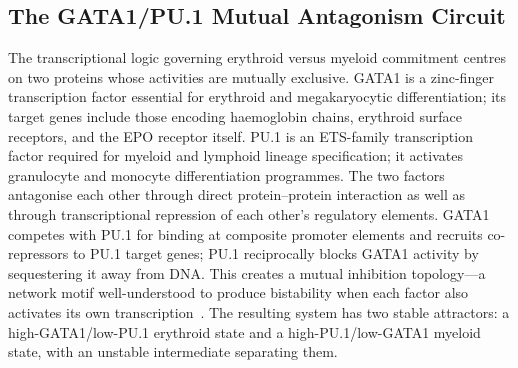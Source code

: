 
\subsection{The GATA1/PU.1 Mutual Antagonism Circuit}

The transcriptional logic governing erythroid versus myeloid commitment centres on two proteins whose activities are mutually exclusive. GATA1 is a zinc-finger transcription factor essential for erythroid and megakaryocytic differentiation; its target genes include those encoding haemoglobin chains, erythroid surface receptors, and the EPO receptor itself. PU.1 is an ETS-family transcription factor required for myeloid and lymphoid lineage specification; it activates granulocyte and monocyte differentiation programmes. The two factors antagonise each other through direct protein--protein interaction as well as through transcriptional repression of each other's regulatory elements. GATA1 competes with PU.1 for binding at composite promoter elements and recruits co-repressors to PU.1 target genes; PU.1 reciprocally blocks GATA1 activity by sequestering it away from DNA. This creates a mutual inhibition topology---a network motif well-understood to produce bistability when each factor also activates its own transcription~\cite{huang2007}. The resulting system has two stable attractors: a high-GATA1/low-PU.1 erythroid state and a high-PU.1/low-GATA1 myeloid state, with an unstable intermediate separating them.


